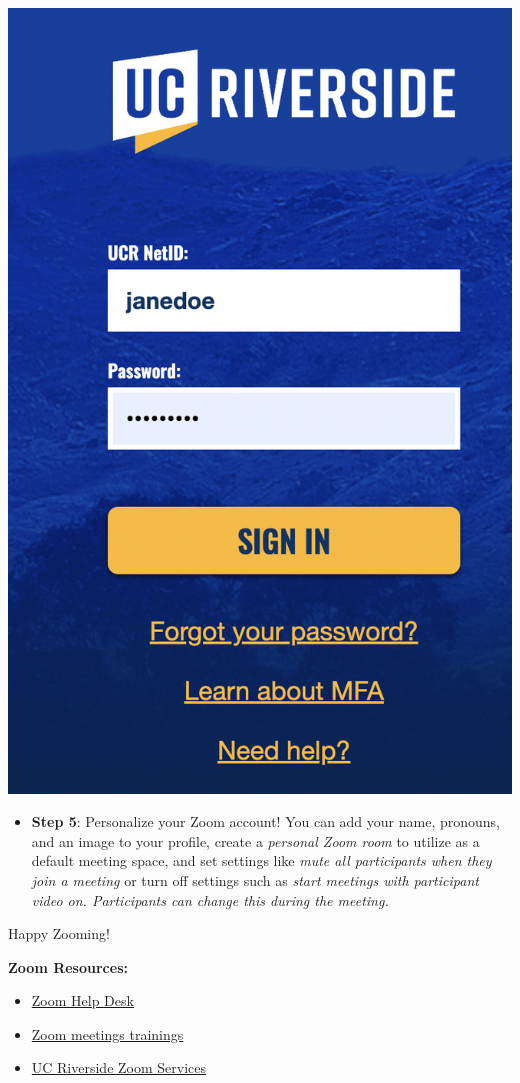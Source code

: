\documentclass[
]{book}
\providecommand{\tightlist}{%
  \setlength{\itemsep}{0pt}\setlength{\parskip}{0pt}}
\begin{document}
\begin{center}\includegraphics[width=0.6\linewidth]{images/zoomcred} \end{center}

\begin{itemize}
\tightlist
\item
  \textbf{Step 5}: Personalize your Zoom account! You can add your name, pronouns, and an image to your profile, create a \emph{personal Zoom room} to utilize as a default meeting space, and set settings like \emph{mute all participants when they join a meeting} or turn off settings such as \emph{start meetings with participant video on. Participants can change this during the meeting.}
\end{itemize}

Happy Zooming!

\textbf{Zoom Resources:}

\begin{itemize}
\tightlist
\item
  \href{https://support.zoom.us/hc/en-us}{Zoom Help Desk}
\item
  \href{https://livetraining.zoom.us/rec/play/6Zx8f-j7qDw3GNeQswSDAPJ-W9S4J6qshiYfqfcNyk20WyIHNFChb7pHZuClKrDVR76R1BxgtMF4txaS?continueMode=true}{Zoom meetings trainings}
\item
  \href{https://ucr.zoom.us/}{UC Riverside Zoom Services}
\end{itemize}
\end{document}
